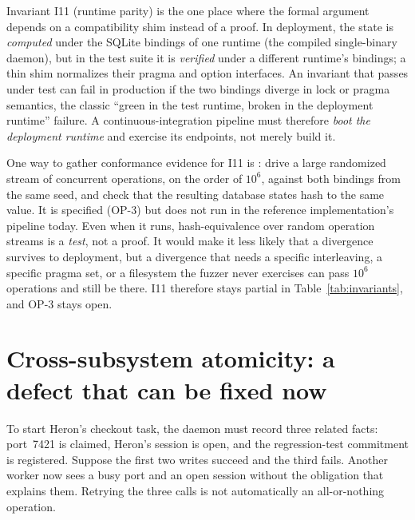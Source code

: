 \documentclass[11pt,a4paper]{article}
\theoremstyle{definition}
\theoremstyle{remark}
\begin{document}
Invariant I11 (runtime parity) is the one place where the formal argument depends
on a compatibility shim instead of a proof. In deployment, the state is \emph{computed}
under the SQLite bindings of one runtime (the compiled single-binary daemon), but in
the test suite it is \emph{verified} under a different runtime's bindings; a thin
shim normalizes their pragma and option interfaces. An invariant that passes under
test can fail in production if the two bindings diverge in lock or pragma semantics,
the classic ``green in the test runtime, broken in the deployment runtime'' failure. A
continuous-integration pipeline must therefore \emph{boot the deployment runtime}
and exercise its endpoints, not merely build it.

One way to gather conformance evidence for I11 is :
drive a large randomized stream of concurrent operations, on the order of $10^6$,
against both bindings from the same seed, and check that the resulting database
states hash to the same value. It is specified (OP-3) but does not run in the
reference implementation's pipeline today. Even when it runs, hash-equivalence over
random operation streams is a \emph{test}, not a proof. It would make it less likely
that a divergence survives to deployment, but a divergence that needs a specific
interleaving, a specific pragma set, or a filesystem the fuzzer never exercises can
pass $10^6$ operations and still be there. I11 therefore stays partial in
Table~\ref{tab:invariants}, and OP-3 stays open.

\pdexercisepointer{\ref{ex:swk-linearizability-assumptions}}{\ref{ex:swk-op3-differential}}{\pageref{ex:swk-linearizability-assumptions}}

\section{Cross-subsystem atomicity: a defect that can be fixed now}
\label{sec:atomicity}

To start Heron's checkout task, the daemon must record three related facts:
port~7421 is claimed, Heron's session is open, and the regression-test
commitment is registered. Suppose the first two writes succeed and the third
fails. Another worker now sees a busy port and an open session without the
obligation that explains them. Retrying the three calls is not automatically
an all-or-nothing operation.
\end{document}
